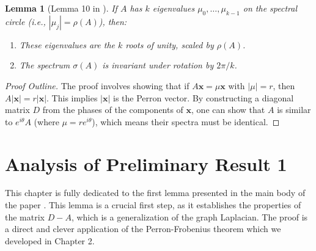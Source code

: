 \documentclass[12pt,a4paper]{report}
\theoremstyle{plain}
\newtheorem{lemma}[theorem]{Lemma}
\theoremstyle{definition}
\theoremstyle{remark}
\begin{document}
\begin{lemma}[Lemma 10 in \cite{main_paper}]
If $A$ has $k$ eigenvalues $\mu_0, \dots, \mu_{k-1}$ on the spectral circle (i.e., $|\mu_j| = \rho(A)$), then:
\begin{enumerate}
    \item These eigenvalues are the $k$ roots of unity, scaled by $\rho(A)$.
    \item The spectrum $\sigma(A)$ is invariant under rotation by $2\pi/k$.
\end{enumerate}
\end{lemma}
\begin{proof}[Proof Outline]
The proof involves showing that if $A\bm{x} = \mu \bm{x}$ with $|\mu| = r$, then $A|\bm{x}| = r|\bm{x}|$. This implies $|\bm{x}|$ is the Perron vector. By constructing a diagonal matrix $D$ from the phases of the components of $\bm{x}$, one can show that $A$ is similar to $e^{i\theta}A$ (where $\mu = re^{i\theta}$), which means their spectra must be identical.
\end{proof}



\chapter{Analysis of Preliminary Result 1}

This chapter is fully dedicated to the first lemma presented in the main body of the paper \cite{main_paper}. This lemma is a crucial first step, as it establishes the properties of the matrix $D-A$, which is a generalization of the graph Laplacian. The proof is a direct and clever application of the Perron-Frobenius theorem which we developed in Chapter 2.
\end{document}
